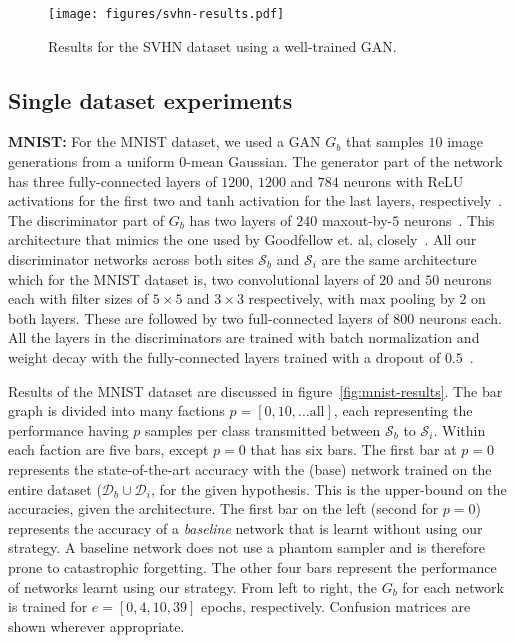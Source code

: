 \documentclass[10pt,twocolumn,letterpaper]{article}
\def \cS{{\mathcal{S}}}
\def \cD{{\mathcal{D}}}
\begin{document}
	\begin{figure}[t]
		\begin{center}
			\texttt{[image: figures/svhn-results.pdf]}
		\end{center}
		
		\caption{Results for the SVHN dataset using a well-trained GAN.}
		
		\label{fig:svhn-results}
	\end{figure}
	
	\subsection{Single dataset experiments}
	
	\noindent\textbf{MNIST:} For the MNIST dataset,  we used a GAN $G_b$ that samples $10$ image generations from a uniform $0$-mean Gaussian. 
	The generator part of the network has three fully-connected layers of $1200$, $1200$ and $784$ neurons with ReLU activations for the first two and tanh activation for the last layers, respectively~\cite{nair2010rectified}. 
	The discriminator part of $G_b$ has two layers of $240$ maxout-by-$5$ neurons~\cite{goodfellow2013maxout}. 
	This architecture that mimics the one used by Goodfellow et. al, closely~\cite{goodfellow2014generative}. 
	All our discriminator networks across both sites $\cS_b$ and $\cS_i$ are the same architecture which for the MNIST dataset is, two convolutional layers of $20$ and $50$ neurons each with filter sizes of $5 \times 5$ and $3 \times 3$ respectively, with max pooling by $2$ on both layers. 
	These are followed by two full-connected layers of $800$ neurons each. 
	All the layers in the discriminators are trained with batch normalization and weight decay with the fully-connected layers trained with a dropout of $0.5$~\cite{srivastava2014dropout, ioffe2015batch}. 
	
	Results of the MNIST dataset are discussed in figure~\ref{fig:mnist-results}.
	The bar graph is divided into many factions $p = [0, 10, \dots \text{all}]$, each representing the performance having $p$ samples per class transmitted between $\cS_b$ to $\cS_i$. 
	Within each faction are five bars, except $p=0$ that has six bars.
	The first bar at $p=0$ represents the state-of-the-art accuracy with the (base) network trained on the entire dataset ($\cD_b \cup \cD_i$, for the given hypothesis.
	This is the upper-bound on the accuracies, given the architecture.
	The first bar on the left (second for $p=0$) represents the accuracy of a \emph{baseline} network that is learnt without using our strategy. 
	A baseline network does not use a phantom sampler and is therefore prone to catastrophic forgetting.
	The other four bars represent the performance of networks learnt using our strategy.
	From left to right, the $G_b$ for each network is trained for $e = [0, 4, 10, 39]$ epochs, respectively. 
	Confusion matrices are shown wherever appropriate. 
	
\end{document}
